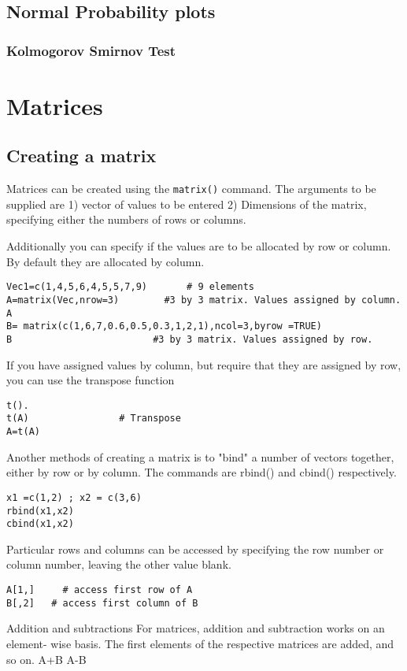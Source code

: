 \documentclass[a4paper,12pt]{article}
\begin{document}
\begin{itemize}
\subsection{Normal Probability plots}
\subsubsection{ Kolmogorov Smirnov Test}



\section{Matrices}
\subsection{Creating a matrix}
Matrices can be created using the \texttt{matrix()} command. The arguments to be supplied are 1) vector of values to be entered
2) Dimensions of the matrix, specifying either the numbers of rows or columns.

Additionally you can specify if the values are to be allocated by row or column. By default they are allocated by column.
\begin{verbatim}
Vec1=c(1,4,5,6,4,5,5,7,9)		# 9 elements
A=matrix(Vec,nrow=3)		#3 by 3 matrix. Values assigned by column.
A
B= matrix(c(1,6,7,0.6,0.5,0.3,1,2,1),ncol=3,byrow =TRUE)
B				          #3 by 3 matrix. Values assigned by row.
\end{verbatim}	
If you have assigned values by column, but require that they are assigned by row, you can use the transpose function
\begin{verbatim}
t().
t(A)				# Transpose
A=t(A)	
\end{verbatim}

Another methods of creating a matrix is to "bind" a number of vectors together, either by row or by column. The commands are rbind() and cbind() respectively.
\begin{verbatim}
x1 =c(1,2) ; x2 = c(3,6)
rbind(x1,x2)
cbind(x1,x2)
\end{verbatim}




Particular rows and columns can be accessed by specifying the row number or column number, leaving the other value blank.
\begin{verbatim}
A[1,]	  # access first row of A
B[,2]   # access first column of B
\end{verbatim}
Addition and subtractions
For matrices, addition and subtraction works on an element- wise basis. The first elements of the respective matrices are added, and so on.
A+B
A-B


\end{itemize}
\end{document}
